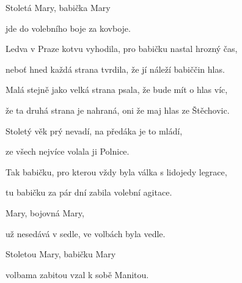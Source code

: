 Stoletá Mary, babička Mary 

jde do volebního boje za kovboje. 
\kr

\zs
Ledva v Praze kotvu vyhodila, pro babičku nastal hrozný čas, 

neboť hned každá strana tvrdila, že jí náleží babiččin hlas. 

\bigskip

Malá stejně jako velká strana psala, že bude mít o hlas víc, 

že ta druhá strana je nahraná, oni že maj hlas ze Štěchovic. 

\bigskip

Stoletý věk prý nevadí, na předáka je to mládí, 

ze všech nejvíce volala ji Polnice. 

\bigskip

Tak babičku, pro kterou vždy byla válka s lidojedy legrace, 

tu babičku za pár dní zabila volební agitace. 
\ks

\zr
Mary, bojovná Mary, 

už nesedává v sedle, ve volbách byla vedle. 

Stoletou Mary, babičku Mary 

volbama zabitou vzal k sobě Manitou.
\kr
\kp
